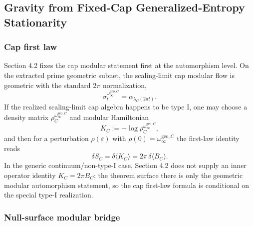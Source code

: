 \subsection{Gravity from Fixed-Cap Generalized-Entropy Stationarity}\label{5-gravity-from-entanglement-equilibrium}

\subsubsection{Cap first law}\label{51-cap-first-law}

Section 4.2 fixes the cap modular statement first at the automorphism level. On the extracted prime geometric subnet, the scaling-limit cap modular flow is geometric with the standard \(2\pi\) normalization,
\[
\sigma_t^{\omega_\infty^{\mathrm{geo},C}}
=
\alpha_{\lambda_C(2\pi t)}.
\]
If the realized scaling-limit cap algebra happens to be type I, one may choose a density matrix \(\rho_C^{\omega_\infty^{\mathrm{geo},C}}\) and modular Hamiltonian
\[
K_C:=-\log\rho_C^{\omega_\infty^{\mathrm{geo},C}},
\]
and then for a perturbation \(\rho(\varepsilon)\) with \(\rho(0)=\omega_\infty^{\mathrm{geo},C}\) the first-law identity reads
\[
\delta S_C=\delta\langle K_C\rangle
=
2\pi\,\delta\langle B_C\rangle.
\]
In the generic continuum/non-type-I case, Section 4.2 does not supply an inner operator identity \(K_C=2\pi B_C\); the theorem surface there is only the geometric modular automorphism statement, so the cap first-law formula is conditional on the special type-I realization.

\subsubsection{Null-surface modular bridge}\label{52-null-surface-modular-bridge}

